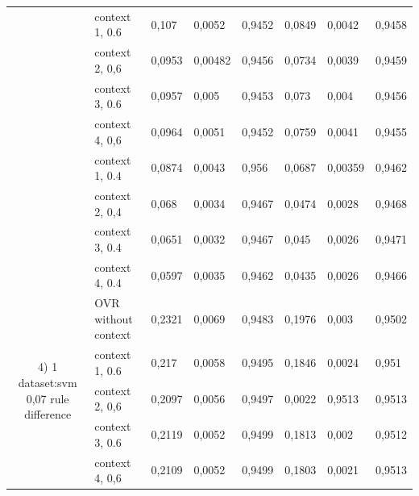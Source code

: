 \documentclass{siamart171218}
\begin{document}
\begin{appendices}
\begin{table}[H]
{\begin{tabular}{|c|l|lll|lll|}
 & context 1, 0.6 & \multicolumn{1}{l|}{0,107} & \multicolumn{1}{l|}{0,0052} & 0,9452 & \multicolumn{1}{l|}{0,0849} & \multicolumn{1}{l|}{0,0042} & 0,9458 \\ \cline{2-8} 
 & context 2, 0,6 & \multicolumn{1}{l|}{0,0953} & \multicolumn{1}{l|}{0,00482} & 0,9456 & \multicolumn{1}{l|}{0,0734} & \multicolumn{1}{l|}{0,0039} & 0,9459 \\ \cline{2-8} 
 & context 3, 0.6 & \multicolumn{1}{l|}{0,0957} & \multicolumn{1}{l|}{0,005} & 0,9453 & \multicolumn{1}{l|}{0,073} & \multicolumn{1}{l|}{0,004} & 0,9456 \\ \cline{2-8} 
 & context 4, 0,6 & \multicolumn{1}{l|}{0,0964} & \multicolumn{1}{l|}{0,0051} & 0,9452 & \multicolumn{1}{l|}{0,0759} & \multicolumn{1}{l|}{0,0041} & 0,9455 \\ \cline{2-8} 
 & context 1, 0.4 & \multicolumn{1}{l|}{0,0874} & \multicolumn{1}{l|}{0,0043} & 0,956 & \multicolumn{1}{l|}{0,0687} & \multicolumn{1}{l|}{0,00359} & 0,9462 \\ \cline{2-8} 
 & context 2, 0,4 & \multicolumn{1}{l|}{0,068} & \multicolumn{1}{l|}{0,0034} & 0,9467 & \multicolumn{1}{l|}{0,0474} & \multicolumn{1}{l|}{0,0028} & 0,9468 \\ \cline{2-8} 
 & context 3, 0.4 & \multicolumn{1}{l|}{0,0651} & \multicolumn{1}{l|}{0,0032} & 0,9467 & \multicolumn{1}{l|}{0,045} & \multicolumn{1}{l|}{0,0026} & 0,9471 \\ \cline{2-8} 
 & context 4, 0.4 & \multicolumn{1}{l|}{0,0597} & \multicolumn{1}{l|}{0,0035} & 0,9462 & \multicolumn{1}{l|}{0,0435} & \multicolumn{1}{l|}{0,0026} & 0,9466 \\ \hline
\multirow{9}{*}{4) 1 dataset:svm 0,07 rule difference} & OVR   without context & \multicolumn{1}{l|}{0,2321} & \multicolumn{1}{l|}{0,0069} & 0,9483 & \multicolumn{1}{l|}{0,1976} & \multicolumn{1}{l|}{0,003} & 0,9502 \\ \cline{2-8} 
 & context 1, 0.6 & \multicolumn{1}{l|}{0,217} & \multicolumn{1}{l|}{0,0058} & 0,9495 & \multicolumn{1}{l|}{0,1846} & \multicolumn{1}{l|}{0,0024} & 0,951 \\ \cline{2-8} 
 & context 2, 0,6 & \multicolumn{1}{l|}{0,2097} & \multicolumn{1}{l|}{0,0056} & 0,9497 & \multicolumn{1}{l|}{0,0022} & \multicolumn{1}{l|}{0,9513} & 0,9513 \\ \cline{2-8} 
 & context 3, 0.6 & \multicolumn{1}{l|}{0,2119} & \multicolumn{1}{l|}{0,0052} & 0,9499 & \multicolumn{1}{l|}{0,1813} & \multicolumn{1}{l|}{0,002} & 0,9512 \\ \cline{2-8} 
 & context 4, 0,6 & \multicolumn{1}{l|}{0,2109} & \multicolumn{1}{l|}{0,0052} & 0,9499 & \multicolumn{1}{l|}{0,1803} & \multicolumn{1}{l|}{0,0021} & 0,9513 \\ \cline{2-8} 

\end{tabular}}
\end{table}
\end{appendices}
\end{document}
